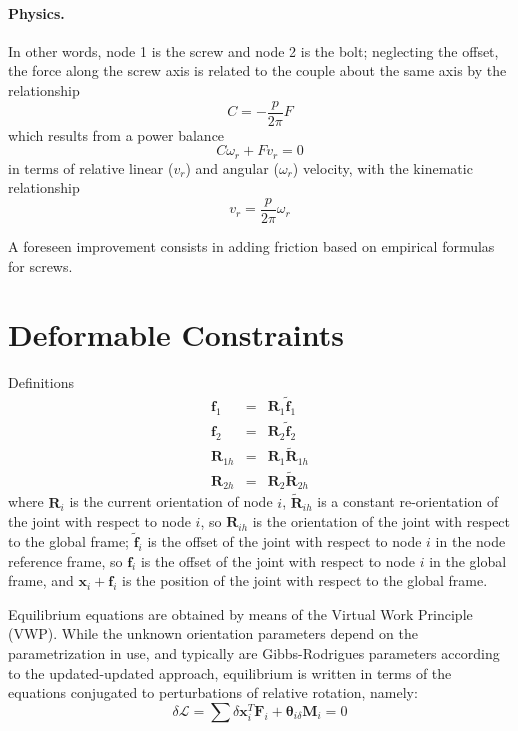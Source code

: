 \documentclass[10pt,dvips,fleqn,subeqn]{report}
\newcommand{\T}[1]{\bm{\mathbf{#1}}}
\begin{document}
\paragraph{Physics.}
In other words, node 1 is the screw and node 2 is the bolt;
neglecting the offset, the force along the screw axis is related
to the couple about the same axis by the relationship
\begin{equation}
	C = - \frac{p}{2\pi} F
\end{equation}
which results from a power balance
\begin{equation}
	C \omega_r + F v_r = 0
\end{equation}
in terms of relative linear ($v_r$) and angular ($\omega_r$) velocity,
with the kinematic relationship
\begin{equation} 
	v_r = \frac{p}{2\pi} \omega_r
\end{equation}

A foreseen improvement consists in adding friction based on empirical
formulas for screws.







\section{Deformable Constraints}
Definitions
\begin{eqnarray*}
	\T{f}_1 & = & \T{R}_1 \tilde{\T{f}}_1 \\
	\T{f}_2 & = & \T{R}_2 \tilde{\T{f}}_2 \\
	\T{R}_{1h} & = & \T{R}_1 \tilde{\T{R}}_{1h} \\
	\T{R}_{2h} & = & \T{R}_2 \tilde{\T{R}}_{2h}
\end{eqnarray*}
where $\T{R}_i$ is the current orientation of node $i$, 
$\tilde{\T{R}}_{ih}$ is a constant re-orientation of the joint
with respect to node $i$, so $\T{R}_{ih}$ is the orientation
of the joint with respect to the global frame;
$\tilde{\T{f}}_i$ is the offset of the joint with respect to
node $i$ in the node reference frame, so $\T{f}_i$ is the offset 
of the joint with respect to node $i$ in the global frame, and
$\T{x}_i+\T{f}_i$ is the position of the joint with respect 
to the global frame.

Equilibrium equations are obtained by means of the Virtual Work
Principle (VWP).
While the unknown orientation parameters depend on the parametrization 
in use, and typically are Gibbs-Rodrigues parameters according 
to the updated-updated approach, equilibrium is written in terms
of the equations conjugated to perturbations of relative rotation,
namely:
\begin{equation}
	\delta\mathcal{L} = \sum \delta\T{x}_i^T \T{F}_i
	+ \T{\theta}_{i\delta} \T{M}_i = 0
\end{equation}
\end{document}
